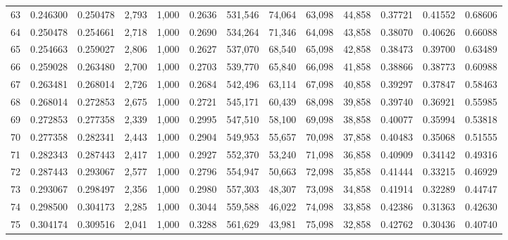 \begin{tabular}{rrrrrrrrrrrrr}
63  &  0.246300 &  0.250478 &   2,793 &  1,000 &                                     0.2636 &  531,546 &   74,064 &   63,098 &   44,858 &  0.37721 &  0.41552 &  0.68606 \\
64  &  0.250478 &  0.254661 &   2,718 &  1,000 &                                     0.2690 &  534,264 &   71,346 &   64,098 &   43,858 &  0.38070 &  0.40626 &  0.66088 \\
65  &  0.254663 &  0.259027 &   2,806 &  1,000 &                                     0.2627 &  537,070 &   68,540 &   65,098 &   42,858 &  0.38473 &  0.39700 &  0.63489 \\
66  &  0.259028 &  0.263480 &   2,700 &  1,000 &                                     0.2703 &  539,770 &   65,840 &   66,098 &   41,858 &  0.38866 &  0.38773 &  0.60988 \\
67  &  0.263481 &  0.268014 &   2,726 &  1,000 &                                     0.2684 &  542,496 &   63,114 &   67,098 &   40,858 &  0.39297 &  0.37847 &  0.58463 \\
68  &  0.268014 &  0.272853 &   2,675 &  1,000 &                                     0.2721 &  545,171 &   60,439 &   68,098 &   39,858 &  0.39740 &  0.36921 &  0.55985 \\
69  &  0.272853 &  0.277358 &   2,339 &  1,000 &                                     0.2995 &  547,510 &   58,100 &   69,098 &   38,858 &  0.40077 &  0.35994 &  0.53818 \\
70  &  0.277358 &  0.282341 &   2,443 &  1,000 &                                     0.2904 &  549,953 &   55,657 &   70,098 &   37,858 &  0.40483 &  0.35068 &  0.51555 \\
71  &  0.282343 &  0.287443 &   2,417 &  1,000 &                                     0.2927 &  552,370 &   53,240 &   71,098 &   36,858 &  0.40909 &  0.34142 &  0.49316 \\
72  &  0.287443 &  0.293067 &   2,577 &  1,000 &                                     0.2796 &  554,947 &   50,663 &   72,098 &   35,858 &  0.41444 &  0.33215 &  0.46929 \\
73  &  0.293067 &  0.298497 &   2,356 &  1,000 &                                     0.2980 &  557,303 &   48,307 &   73,098 &   34,858 &  0.41914 &  0.32289 &  0.44747 \\
74  &  0.298500 &  0.304173 &   2,285 &  1,000 &                                     0.3044 &  559,588 &   46,022 &   74,098 &   33,858 &  0.42386 &  0.31363 &  0.42630 \\
75  &  0.304174 &  0.309516 &   2,041 &  1,000 &                                     0.3288 &  561,629 &   43,981 &   75,098 &   32,858 &  0.42762 &  0.30436 &  0.40740 \\

\end{tabular}
